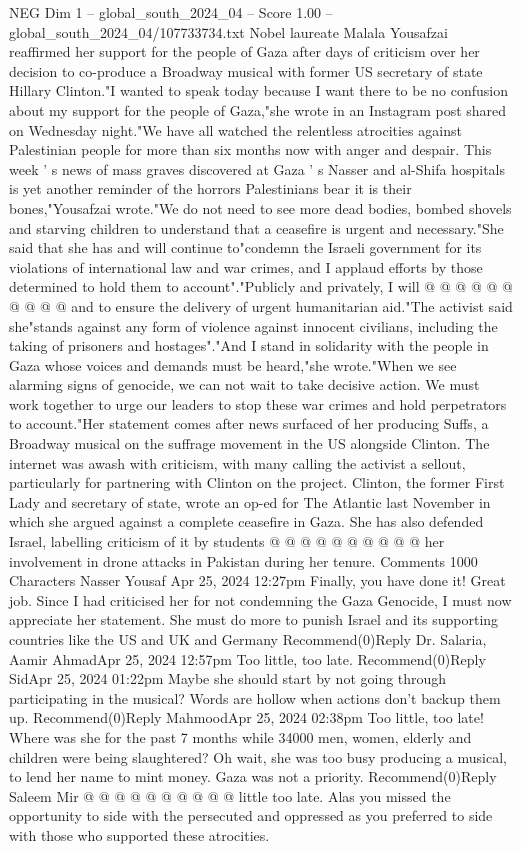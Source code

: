 \begin{textsample}{NEG Dim 1 – global\_south\_2024\_04 – Score 1.00 – global\_south\_2024\_04/107733734.txt}  \label{ex:f1_neg_412}
Nobel laureate Malala Yousafzai reaffirmed her support for the people of Gaza after days of criticism over her decision to co-produce a Broadway musical with former US secretary of state Hillary Clinton."I wanted to speak today because I want there to be no confusion about my support for the people of Gaza,"she wrote in an Instagram post shared on Wednesday night."We have all watched the relentless atrocities against Palestinian people for more than six months now with anger and despair.
This week ' s news of mass graves discovered at Gaza ' s Nasser and al-Shifa hospitals is yet another reminder of the horrors Palestinians bear it is their bones,"Yousafzai wrote."We do not need to see more dead bodies, bombed shovels and starving children to understand that a ceasefire is urgent and necessary."She said that she has and will continue to"condemn the Israeli government for its violations of international law and war crimes, and I applaud efforts by those determined to hold them to account"."Publicly and privately, I will @ @ @ @ @ @ @ @ @ @ and to ensure the delivery of urgent humanitarian aid."The activist said she"stands against any form of violence against innocent civilians, including the taking of prisoners and hostages"."And I stand in solidarity with the people in Gaza whose voices and demands must be heard,"she wrote."When we see alarming signs of genocide, we can not wait to take decisive action.
We must work together to urge our leaders to stop these war crimes and hold perpetrators to account."Her statement comes after news surfaced of her producing Suffs, a Broadway musical on the suffrage movement in the US alongside Clinton.
The internet was awash with criticism, with many calling the activist a sellout, particularly for partnering with Clinton on the project.
Clinton, the former First Lady and secretary of state, wrote an op-ed for The Atlantic last November in which she argued against a complete ceasefire in Gaza.
She has also defended Israel, labelling criticism of it by students @ @ @ @ @ @ @ @ @ @ her involvement in drone attacks in Pakistan during her tenure.
Comments 1000 Characters Nasser Yousaf Apr 25, 2024 12:27pm Finally, you have done it!
Great job.
Since I had criticised her for not condemning the Gaza Genocide, I must now appreciate her statement.
She must do more to punish Israel and its supporting countries like the US and UK and Germany Recommend(0)Reply Dr.
Salaria, Aamir AhmadApr 25, 2024 12:57pm Too little, too late.
Recommend(0)Reply SidApr 25, 2024 01:22pm Maybe she should start by not going through participating in the musical?
Words are hollow when actions don't backup them up.
Recommend(0)Reply MahmoodApr 25, 2024 02:38pm Too little, too late!
Where was she for the past 7 months while 34000 men, women, elderly and children were being slaughtered?
Oh wait, she was too busy producing a musical, to lend her name to mint money.
Gaza was not a priority.
Recommend(0)Reply Saleem Mir @ @ @ @ @ @ @ @ @ @ little too late.
Alas you missed the opportunity to side with the persecuted and oppressed as you preferred to side with those who supported these atrocities.

\end{textsample}

